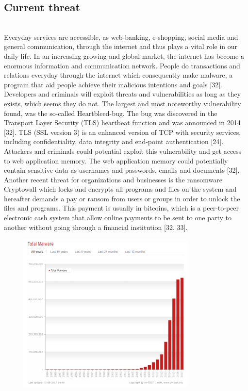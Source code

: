 \documentclass[12pt]{article} %
\begin{document}
\subsection{Current threat}
\\ 
Everyday services are accessible, as web-banking, e-shopping, social media and general communication, through the internet and thus plays a vital role in our daily life. In an increasing growing and global market, the internet has become a enormous information and communication network. People do transactions and relations everyday through the internet which consequently make malware, a program that aid people achieve their malicious intentions and goals [32]. \\
Developers and criminals will exploit threats and vulnerabilities as long as they exists, which seems they do not. The largest and most noteworthy  vulnerability found, was the so-called Heartbleed-bug. The bug was  discovered in the Transport Layer Security (TLS) heartbeat function and was announced in 2014 [32]. TLS (SSL version 3) is an enhanced version of TCP with security services, including confidentiality, data integrity and end-point authentication [24]. Attackers and criminals could potential exploit this vulnerability and get access to web application memory. The web application memory could potentially contain sensitive data as usernames and passwords, emails and documents [32]. \\
Another recent threat for organizations and businesses is the ransomware Cryptowall which locks and encrypts all programs and files on the system and hereafter demands a pay or ransom from users or groups in order to unlock the files and programs. This payment is usually in bitcoins, which is a peer-to-peer electronic cash system that allow online payments to be sent to one party to another without going through a financial institution [32, 33]. \\
\begin{figure}[H]
    \centering
    \includegraphics[width=0.8\textwidth]{totalmalware}
    \captionsetup{width=0.8\textwidth}
    \caption{}
    \label{fig:totalmalware}
\end{figure}
\end{document}
